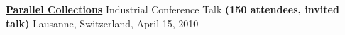 \documentclass[9pt]{article}
\begin{document}
\noindent\href{http://days2010.scala-lang.org/node/138/140/}
{\bf Parallel Collections}
\vspace{-0.03in}
\newline\noindent Industrial Conference Talk \textbf{(150 attendees, invited talk)}
\dates{}
\linebreak\noindent Lausanne, Switzerland, April 15, 2010
\bigskip



\bigskip





\end{document}
